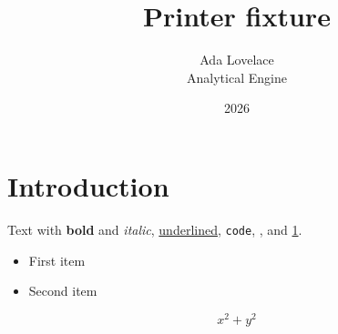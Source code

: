 \documentclass[12pt]{article}
\title{Printer fixture}
\author{Ada Lovelace\\Analytical Engine}
\date{2026}
\begin{document}
\maketitle

\section{Introduction}\label{sec:intro}
Text with \textbf{bold} and \textit{italic}, \underline{underlined},
\verb|code|, \cite{lovelace}, and \ref{sec:intro}.

\begin{itemize}
\item First item
\item Second item
\end{itemize}

\begin{equation}
x^2 + y^2
\label{eq:sum}
\end{equation}
\end{document}
